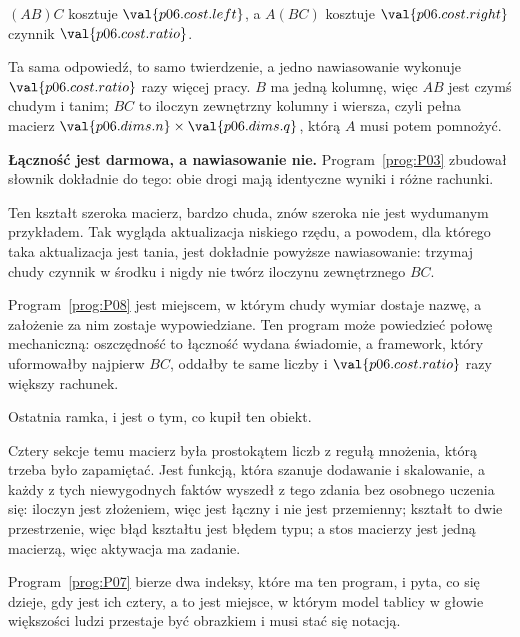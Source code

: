 \begin{fr}
\begin{ansblock}
$(AB)C$ kosztuje $\val{p06.cost.left}$, a $A(BC)$ kosztuje
$\val{p06.cost.right}$ \dash{} czynnik $\val{p06.cost.ratio}$.
\end{ansblock}

Ta sama odpowiedź, to samo twierdzenie, a jedno nawiasowanie wykonuje
$\val{p06.cost.ratio}$ razy więcej pracy. $B$ ma jedną kolumnę, więc $AB$ jest
czymś chudym i tanim; $BC$ to iloczyn zewnętrzny kolumny i wiersza, czyli pełna
macierz $\val{p06.dims.n} \times \val{p06.dims.q}$, którą $A$ musi potem
pomnożyć.

\textbf{Łączność jest darmowa, a nawiasowanie nie.} Program~\ref{prog:P03}
zbudował słownik dokładnie do tego: obie drogi mają identyczne wyniki i różne
rachunki.
\end{fr}

\begin{fr}
\begin{aibox}
Ten kształt \dash{} szeroka macierz, bardzo chuda, znów szeroka \dash{} nie
jest wydumanym przykładem. Tak wygląda aktualizacja niskiego rzędu, a powodem,
dla którego taka aktualizacja jest tania, jest dokładnie powyższe nawiasowanie:
trzymaj chudy czynnik w środku i nigdy nie twórz iloczynu zewnętrznego $BC$.

Program~\ref{prog:P08} jest miejscem, w którym chudy wymiar dostaje nazwę, a
założenie za nim zostaje wypowiedziane. Ten program może powiedzieć połowę
mechaniczną: oszczędność to łączność wydana świadomie, a framework, który
uformowałby najpierw $BC$, oddałby te same liczby i
$\val{p06.cost.ratio}$ razy większy rachunek.
\end{aibox}
\end{fr}

\begin{fr}
Ostatnia ramka, i jest o tym, co kupił ten obiekt.

Cztery sekcje temu macierz była prostokątem liczb z regułą mnożenia, którą
trzeba było zapamiętać. Jest funkcją, która szanuje dodawanie i skalowanie, a
każdy z tych niewygodnych faktów wyszedł z tego zdania bez osobnego uczenia
się: iloczyn jest złożeniem, więc jest łączny i nie jest przemienny; kształt to
dwie przestrzenie, więc błąd kształtu jest błędem typu; a stos macierzy jest
jedną macierzą, więc aktywacja ma zadanie.

Program~\ref{prog:P07} bierze dwa indeksy, które ma ten program, i pyta, co się
dzieje, gdy jest ich cztery, a to jest miejsce, w którym model tablicy w głowie
większości ludzi przestaje być obrazkiem i musi stać się notacją.
\end{fr}

